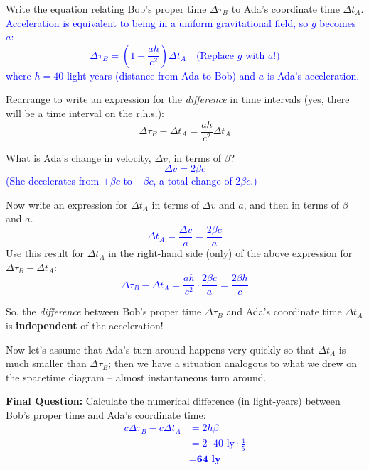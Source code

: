 \documentclass[11pt, letterpaper, openany]{book}
\newenvironment{exercise}[1][Exercise]{%
  \tcolorbox[blanker, breakable, left=1em,
    before skip=1em, after skip=1em,
    borderline west={3pt}{0pt}{PhysNavy},
    colback=PhysCream,
    before upper={\textcolor{PhysNavy}{\sffamily\bfseries #1:}\space}
  ]%
}{%
  \endtcolorbox%
}
\begin{document}
\begin{exercise}[Exercise 15]
Write the equation relating Bob's proper time $\Delta\tau_B$ to Ada's coordinate time $\Delta t_A$. \\
\textcolor{blue}{
Acceleration is equivalent to being in a uniform gravitational field, so $g$ becomes $a$:
\[ \Delta\tau_B = \left(1 + \frac{ah}{c^2}\right)\Delta t_A \quad \text{(Replace $g$ with $a$!)} \]
where $h = 40$ light-years (distance from Ada to Bob) and $a$ is Ada's acceleration.
}
\end{exercise}

Rearrange to write an expression for the \textit{difference} in time intervals (yes, there will be a time interval on the r.h.s.):
\[ \Delta\tau_B - \Delta t_A = \frac{ah}{c^2}\Delta t_A \]

\begin{exercise}[Exercise 16]
What is Ada's change in velocity, $\Delta v$, in terms of $\beta$? \\
\textcolor{blue}{
\[ \Delta v = 2\beta c \]
(She decelerates from $+\beta c$ to $-\beta c$, a total change of $2\beta c$.)
}
\end{exercise}

\begin{exercise}[Exercise 17]
Now write an expression for $\Delta t_A$ in terms of $\Delta v$ and $a$, and then in terms of $\beta$ and $a$. \\
\textcolor{blue}{
\[ \Delta t_A = \frac{\Delta v}{a} = \frac{2\beta c}{a} \]
}
Use this result for $\Delta t_A$ in the right-hand side (only) of the above expression for $\Delta\tau_B - \Delta t_A$: \\
\textcolor{blue}{
\[ \Delta\tau_B - \Delta t_A = \frac{ah}{c^2} \cdot \frac{2\beta c}{a} = \frac{2\beta h}{c} \]
}
\end{exercise}

So, the \textit{difference} between Bob's proper time $\Delta\tau_B$ and Ada's coordinate time $\Delta t_A$ is \textbf{independent} of the acceleration!

Now let's assume that Ada's turn-around happens very quickly so that $\Delta t_A$ is much smaller than $\Delta\tau_B$; then we have a situation analogous to what we drew on the spacetime diagram -- almost instantaneous turn around.

\textbf{Final Question:} Calculate the numerical difference (in light-years) between Bob's proper time and Ada's coordinate time:
\textcolor{blue}{
\begin{align*}
    c\Delta\tau_B - c\Delta t_A &= 2h\beta \\
    &= 2 \cdot 40 \text{ ly} \cdot \frac{4}{5} \\
    &= \textbf{64 ly}
\end{align*}
}
\end{document}
